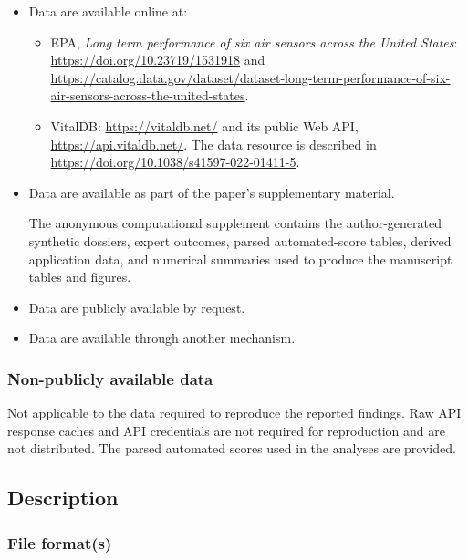\documentclass[
  10pt,
]{article}
\providecommand{\tightlist}{%
  \setlength{\itemsep}{0pt}\setlength{\parskip}{0pt}}
\begin{document}
\begin{itemize}
\item[$\boxtimes$]
  Data are available online at:

  \begin{itemize}
  \tightlist
  \item
    EPA, \emph{Long term performance of six air sensors across the
    United States}: \url{https://doi.org/10.23719/1531918} and
    \url{https://catalog.data.gov/dataset/dataset-long-term-performance-of-six-air-sensors-across-the-united-states}.
  \item
    VitalDB: \url{https://vitaldb.net/} and its public Web API,
    \url{https://api.vitaldb.net/}. The data resource is described in
    \url{https://doi.org/10.1038/s41597-022-01411-5}.
  \end{itemize}
\item[$\boxtimes$]
  Data are available as part of the paper's supplementary material.

  The anonymous computational supplement contains the author-generated
  synthetic dossiers, expert outcomes, parsed automated-score tables,
  derived application data, and numerical summaries used to produce the
  manuscript tables and figures.
\item[$\square$]
  Data are publicly available by request.
\item[$\square$]
  Data are available through another mechanism.
\end{itemize}

\subsubsection{Non-publicly available
data}\label{non-publicly-available-data}

Not applicable to the data required to reproduce the reported findings.
Raw API response caches and API credentials are not required for
reproduction and are not distributed. The parsed automated scores used
in the analyses are provided.

\subsection{Description}\label{description}

\subsubsection{File format(s)}\label{file-formats}
\end{document}
